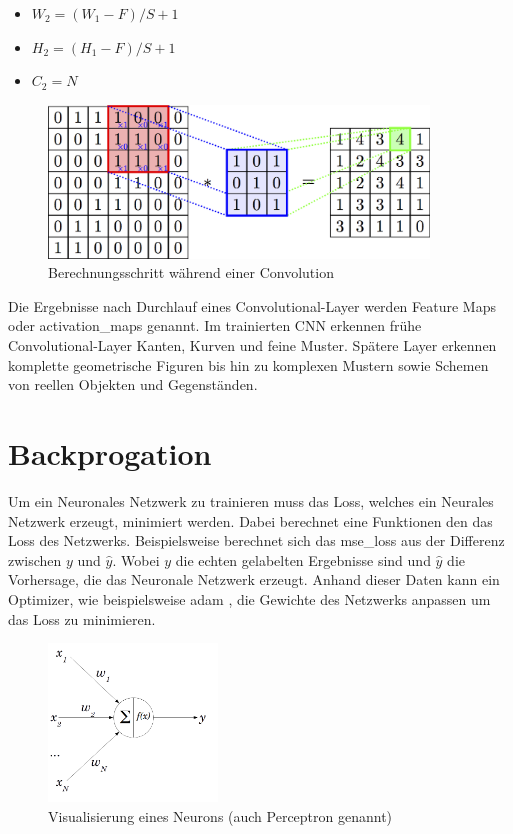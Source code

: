 \begin{itemize}
	\item $ W_2 = (W_1 - F) / S + 1 $
	\item $ H_2 = (H_1 - F) / S + 1 $
	\item $ C_2 = N $
\end{itemize}

\begin{figure}[H]
	\centering
	\includegraphics[width=0.90\textwidth]{resources/content/cnn/convolution_croped.png}
	\caption{Berechnungsschritt während einer Convolution \cite{convolution_img}}
	\label{img:convolution_img}
\end{figure}

Die Ergebnisse nach Durchlauf eines Convolutional-Layer werden Feature Maps oder \gls{activation_map}s genannt. Im trainierten CNN erkennen frühe Convolutional-Layer Kanten, Kurven und feine Muster. Spätere Layer erkennen komplette geometrische Figuren bis hin zu komplexen Mustern sowie Schemen von reellen Objekten und Gegenständen.

\section{Backprogation}
\label{sec:backpropagation}

Um ein Neuronales Netzwerk zu trainieren muss das Loss, welches ein Neurales Netzwerk erzeugt, minimiert werden. Dabei berechnet eine Funktionen den das Loss des Netzwerks. Beispielsweise berechnet sich das \gls{mse_loss} aus der Differenz zwischen $ y $ und $ \hat{y} $. Wobei $ y $ die echten gelabelten Ergebnisse sind und $ \hat{y} $ die Vorhersage, die das Neuronale Netzwerk erzeugt.
Anhand dieser Daten kann ein Optimizer, wie beispielsweise \gls{adam} \cite{kingma2015adam}, die Gewichte des Netzwerks anpassen um das Loss zu minimieren.

\begin{figure}[H]
	\centering
	\includegraphics[width=0.4\textwidth]{resources/content/perceptron.png}
	\caption{Visualisierung eines Neurons (auch Perceptron \cite{80230} genannt) \cite{perceptron_img}}
	\label{img:perceptron_img}
\end{figure}

